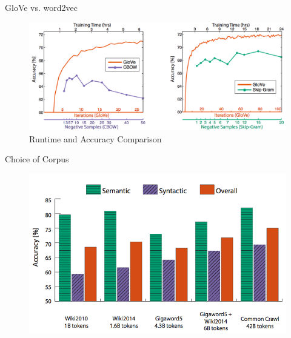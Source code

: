 \begin{frame}{GloVe vs. word2vec}
  \begin{figure}
    \centering
    \includegraphics[scale=0.29]{images/gloveVSword2vec.png}
    \caption{Runtime and Accuracy Comparison}
  \end{figure}
\end{frame}

\begin{frame}{Choice of Corpus}
  \begin{figure}
    \centering
    \includegraphics[scale=0.4]{images/corpus.png}
  \end{figure}
\end{frame}

